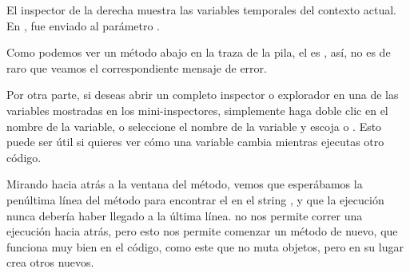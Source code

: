 \documentclass[spanish,a4paper,10pt,twoside]{book}
\begin{document}
El inspector de la derecha muestra las variables temporales del contexto actual.
En ,
 fue enviado al par\'ametro .


Como podemos ver un m\'etodo abajo en la traza de la pila, el  es , as\'i, no es de raro que veamos el correspondiente mensaje de error.

Por otra parte, si deseas abrir un completo inspector o explorador en una de las variables mostradas en los mini-inspectores, simplemente haga doble clic en el nombre de la variable, o seleccione el nombre de la variable y \actclick escoja  o .
Esto puede ser \'util si quieres ver c\'omo una variable cambia mientras ejecutas otro c\'odigo.

Mirando hacia atr\'as a la ventana del m\'etodo, vemos que esper\'abamos la
pen\'ultima l\'inea del m\'etodo para encontrar el  en el string , y que la ejecuci\'on nunca deber\'ia haber llegado a la \'ultima l\'inea. \pharo no nos permite correr una ejecuci\'on hacia atr\'as, pero esto nos permite comenzar un m\'etodo de nuevo, que funciona muy bien en el c\'odigo, como este que no muta objetos, pero en su lugar crea otros nuevos.

\end{document}
